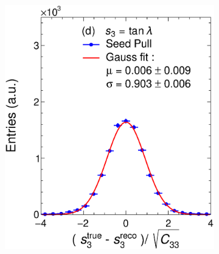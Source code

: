 \begin{figure}[t]
\begin{subfigure}{0.32\textwidth}
         \caption{}
         \label{fig:resp2Seed_GArLite_ALICE+KF}
     \end{subfigure}
          \begin{subfigure}{0.32\textwidth}
         \centering
         \includegraphics[width=\textwidth]{figures/ch4-KF_NDGArLite/MC/ALICE+KF/UnitSeed_p3.eps}
         \caption{}
         \label{fig:resp3Seed_GArLite_ALICE+KF}
     \end{subfigure}
     \begin{subfigure}{0.32\textwidth}
         \centering

\end{subfigure}
\end{figure}
